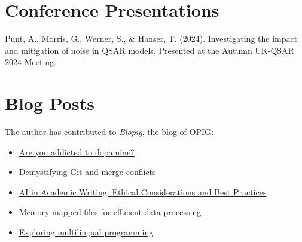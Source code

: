 \section*{Conference Presentations}
Punt, A., Morris, G., Werner, S., \& Hanser, T. (2024). Investigating the impact and mitigation of noise in QSAR models. Presented at the Autumn UK-QSAR 2024 Meeting.


\section*{Blog Posts}

The author has contributed to \textit{Blopig}, the blog of OPIG:

\begin{itemize}
    \item \href{https://www.blopig.com/blog/2025/10/are-you-addicted-to-dopamine/}{Are you addicted to dopamine?}
    \item \href{https://www.blopig.com/blog/2025/05/demystifying-git-and-merge-conflicts/}{Demystifying Git and merge conflicts}
    \item \href{https://www.blopig.com/blog/2025/03/ai-in-academic-writing-ethical-considerations-and-best-practices/}{AI in Academic Writing: Ethical Considerations and Best Practices}
    \item \href{https://www.blopig.com/blog/2024/08/memory-mapped-files-for-efficient-data-processing/}{Memory-mapped files for efficient data processing}
    \item \href{https://www.blopig.com/blog/2024/04/exploring-multilingual-programming/}{Exploring multilingual programming}
\end{itemize}

